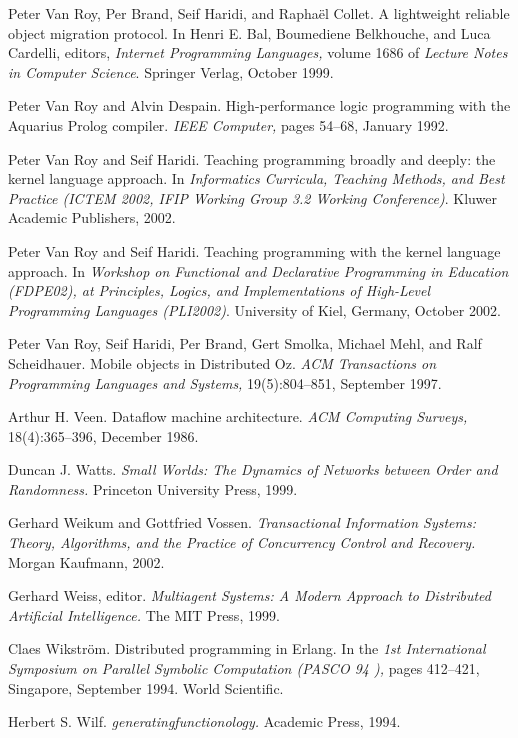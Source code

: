 \begin{thebibliography}{213}
Peter Van Roy, Per Brand, Seif Haridi, and Rapha\"el Collet. A lightweight reliable object migration protocol. In Henri E. Bal, Boumediene Belkhouche, and Luca Cardelli, editors, \emph{Internet Programming Languages,} volume 1686 of \emph{Lecture Notes in Computer Science}. Springer Verlag, October 1999.

Peter Van Roy and Alvin Despain. High-performance logic programming with the Aquarius Prolog compiler. \emph{IEEE Computer,} pages 54–68, January 1992.

Peter Van Roy and Seif Haridi. Teaching programming broadly and deeply: the kernel language approach. In \emph{Informatics Curricula, Teaching Methods, and Best Practice (ICTEM 2002, IFIP Working Group 3.2 Working Conference)}. Kluwer Academic Publishers, 2002.

Peter Van Roy and Seif Haridi. Teaching programming with the kernel language approach. In \emph{Workshop on Functional and Declarative Programming in Education (FDPE02), at Principles, Logics, and Implementations of High-Level Programming Languages (PLI2002)}. University of Kiel, Germany, October 2002.

Peter Van Roy, Seif Haridi, Per Brand, Gert Smolka, Michael Mehl, and Ralf Scheidhauer. Mobile objects in Distributed Oz. \emph{ACM Transactions on Programming Languages and Systems,} 19(5):804–851, September 1997.

Arthur H. Veen. Dataflow machine architecture. \emph{ACM Computing Surveys,} 18(4):365–396, December 1986.

Duncan J. Watts. \emph{Small Worlds: The Dynamics of Networks between Order and Randomness.} Princeton University Press, 1999.

Gerhard Weikum and Gottfried Vossen. \emph{Transactional Information Systems: Theory, Algorithms, and the Practice of Concurrency Control and Recovery.} Morgan Kaufmann, 2002.

Gerhard Weiss, editor. \emph{Multiagent Systems: A Modern Approach to Distributed Artificial Intelligence.} The MIT Press, 1999.

Claes Wikstr\"om. Distributed programming in Erlang. In the \emph{1st International Symposium on Parallel Symbolic Computation (PASCO 94 ),} pages 412–421, Singapore, September 1994. World Scientific.

Herbert S. Wilf. \emph{generatingfunctionology.} Academic Press, 1994.


\end{thebibliography}
